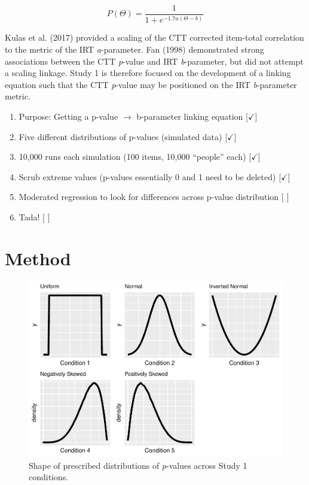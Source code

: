\documentclass[
  man]{apa6}
\providecommand{\tightlist}{%
  \setlength{\itemsep}{0pt}\setlength{\parskip}{0pt}}
\begin{document}
\begin{equation}
P(\Theta)=\frac{1}{1+e^{-1.7a(\Theta-b)}}
\end{equation}

Kulas et al. (2017) provided a scaling of the CTT corrected item-total correlation to the metric of the IRT \emph{a}-parameter. Fan (1998) demonstrated strong associations between the CTT \emph{p}-value and IRT \emph{b}-parameter, but did not attempt a scaling linkage. Study 1 is therefore focused on the development of a linking equation such that the CTT \emph{p}-value may be positioned on the IRT \emph{b}-parameter metric.

\begin{enumerate}
\def\labelenumi{\arabic{enumi}.}
\tightlist
\item
  Purpose: Getting a p-value \(\rightarrow\) b-parameter linking equation {[}\(\checkmark\){]}
\item
  Five different distributions of p-values (simulated data) {[}\(\checkmark\){]}
\item
  10,000 runs each simulation (100 items, 10,000 ``people'' each) {[}\(\checkmark\){]}\\
\item
  Scrub extreme values (p-values essentially 0 and 1 need to be deleted) {[}\(\checkmark\){]}
\item
  Moderated regression to look for differences across p-value distribution {[} {]}
\item
  Tada! {[} {]}
\end{enumerate}

\hypertarget{method}{%
\section{Method}\label{method}}

\begin{figure}
\centering
\includegraphics{ICC_project_files/figure-latex/simulatedgraphs-1.pdf}
\caption{\label{fig:simulatedgraphs}Shape of prescribed distributions of \emph{p}-values across Study 1 conditions.}
\end{figure}
\end{document}
